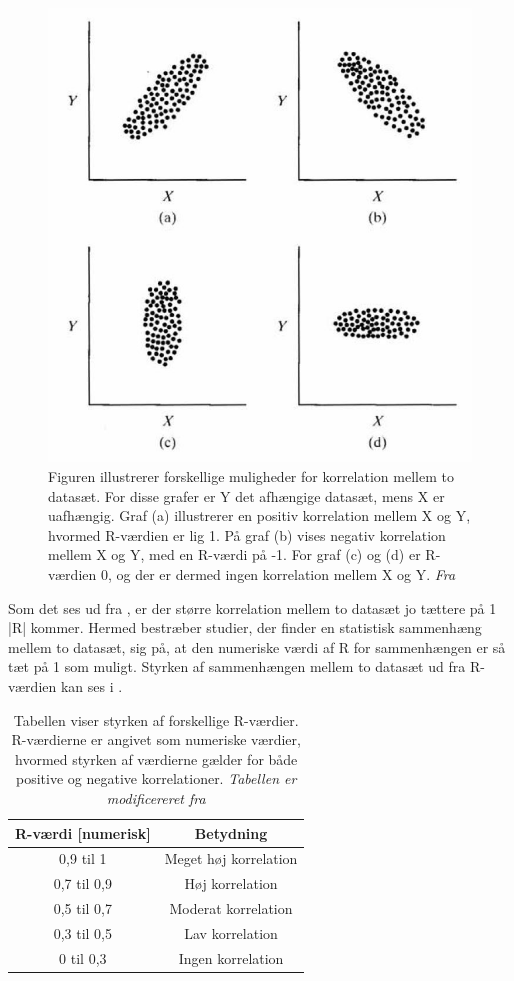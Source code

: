 \begin{figure}[H]
\centering
\includegraphics[width=.4\textwidth]{figures/dHTAanalyse/r_vaerdi}
\caption{Figuren illustrerer forskellige muligheder for korrelation mellem to datasæt. For disse grafer er Y det afhængige datasæt, mens X er uafhængig. Graf (a) illustrerer en positiv korrelation mellem X og Y, hvormed R-værdien er lig 1. På graf (b) vises negativ korrelation mellem X og Y, med en R-værdi på -1. For graf (c) og (d) er R-værdien 0, og der er dermed ingen korrelation mellem X og Y. \textit{Fra }}\label{fig:r_vaerdi}
\end{figure}\vspace{-.25cm}

Som det ses ud fra , er der større korrelation mellem to datasæt jo tættere på 1 |R| kommer. Hermed bestræber studier, der finder en statistisk sammenhæng mellem to datasæt, sig på, at den numeriske værdi af R for sammenhængen er så tæt på 1 som muligt. Styrken af sammenhængen mellem to datasæt ud fra R-værdien kan ses i . \\

\begin{table}[H]
\centering
\begin{tabular}{cc}
\rowcolor[HTML]{C0C0C0} 
R-værdi {[}numerisk{]} & Betydning  \\ \hline
0,9 til 1              & Meget høj korrelation              \\
0,7 til 0,9            & Høj korrelation                    \\
0,5 til 0,7            & Moderat korrelation                \\
0,3 til 0,5            & Lav korrelation                    \\
0 til 0,3              & Ingen korrelation                  \\ \hline
\end{tabular}
\caption{Tabellen viser styrken af forskellige R-værdier. R-værdierne er angivet som numeriske værdier, hvormed styrken af værdierne gælder for både positive og negative korrelationer. \textit{Tabellen er modificereret fra }}
\label{tab:styrke_r}
\end{table}


